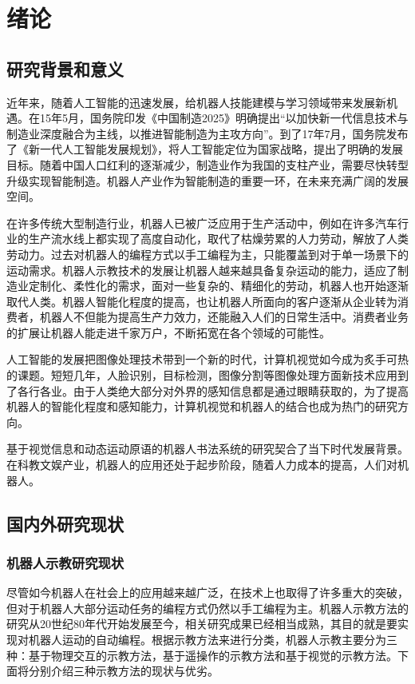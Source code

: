 \chapter{绪论}
\section{研究背景和意义}
近年来，随着人工智能的迅速发展，给机器人技能建模与学习领域带来发展新机遇。在15年5月，国务院印发《中国制造2025》明确提出“以加快新一代信息技术与制造业深度融合为主线，以推进智能制造为主攻方向”。到了17年7月，国务院发布了《新一代人工智能发展规划》，将人工智能定位为国家战略，提出了明确的发展目标\cite{Qin2019}。随着中国人口红利的逐渐减少，制造业作为我国的支柱产业，需要尽快转型升级实现智能制造。机器人产业作为智能制造的重要一环，在未来充满广阔的发展空间。

在许多传统大型制造行业，机器人已被广泛应用于生产活动中，例如在许多汽车行业的生产流水线上都实现了高度自动化，取代了枯燥劳累的人力劳动，解放了人类劳动力。过去对机器人的编程方式以手工编程为主，只能覆盖到对于单一场景下的运动需求。机器人示教技术的发展让机器人越来越具备复杂运动的能力，适应了制造业定制化、柔性化的需求，面对一些复杂的、精细化的劳动，机器人也开始逐渐取代人类。机器人智能化程度的提高，也让机器人所面向的客户逐渐从企业转为消费者，机器人不但能为提高生产力效力，还能融入人们的日常生活中。消费者业务的扩展让机器人能走进千家万户，不断拓宽在各个领域的可能性。

人工智能的发展把图像处理技术带到一个新的时代，计算机视觉如今成为炙手可热的课题。短短几年，人脸识别，目标检测，图像分割等图像处理方面新技术应用到了各行各业。由于人类绝大部分对外界的感知信息都是通过眼睛获取的，为了提高机器人的智能化程度和感知能力，计算机视觉和机器人的结合也成为热门的研究方向。

基于视觉信息和动态运动原语的机器人书法系统的研究契合了当下时代发展背景。在科教文娱产业，机器人的应用还处于起步阶段，随着人力成本的提高，人们对机器人。



\section{国内外研究现状}
\subsection{机器人示教研究现状}
尽管如今机器人在社会上的应用越来越广泛，在技术上也取得了许多重大的突破，但对于机器人大部分运动任务的编程方式仍然以手工编程为主。机器人示教方法的研究从20世纪80年代开始发展至今，相关研究成果已经相当成熟，其目的就是要实现对机器人运动的自动编程。根据示教方法来进行分类，机器人示教主要分为三种：基于物理交互的示教方法，基于遥操作的示教方法和基于视觉的示教方法。下面将分别介绍三种示教方法的现状与优劣。

